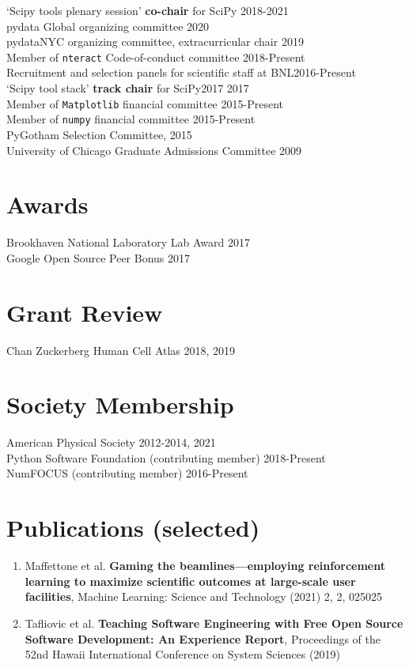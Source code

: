\documentclass[margin]{res} %
\begin{document}
\begin{resume}
`Scipy tools plenary session' {\bf co-chair} for SciPy \hfill 2018-2021\\
pydata Global organizing committee  \hfill 2020\\
pydataNYC organizing committee, extracurricular chair \hfill 2019\\
Member of {\tt nteract} Code-of-conduct committee \hfill 2018-Present\\
Recruitment and selection panels for scientific staff at BNL\hfill 2016-Present\\
`Scipy tool stack' {\bf track chair} for SciPy2017 \hfill 2017\\
Member of {\tt Matplotlib} financial committee \hfill 2015-Present\\
Member of {\tt numpy} financial committee \hfill 2015-Present\\
PyGotham Selection Committee, \hfill 2015\\
University of Chicago Graduate Admissions Committee \hfill 2009

\section{Awards}
Brookhaven National Laboratory Lab Award \hfill 2017\\
Google Open Source Peer Bonus \hfill 2017

\section{Grant Review}
Chan Zuckerberg Human Cell Atlas \hfill 2018, 2019

\section{Society Membership}

American Physical Society \hfill 2012-2014, 2021\\
Python Software Foundation (contributing member) \hfill 2018-Present\\
NumFOCUS (contributing member) \hfill 2016-Present

\section{Publications (selected)}

\begin{enumerate}
  \setlength{\itemsep}{-1pt}
  \item Maffettone et al. \textbf{Gaming the beamlines—employing reinforcement
    learning to maximize scientific outcomes at large-scale user facilities},
    Machine Learning: Science and Technology (2021) 2, 2, 025025
  \item Tafliovic et al. \textbf{Teaching Software Engineering with
    Free Open Source Software Development: An Experience Report},
    Proceedings of the 52nd Hawaii International Conference on System
    Sciences (2019)


\end{enumerate}
\end{resume}
\end{document}
